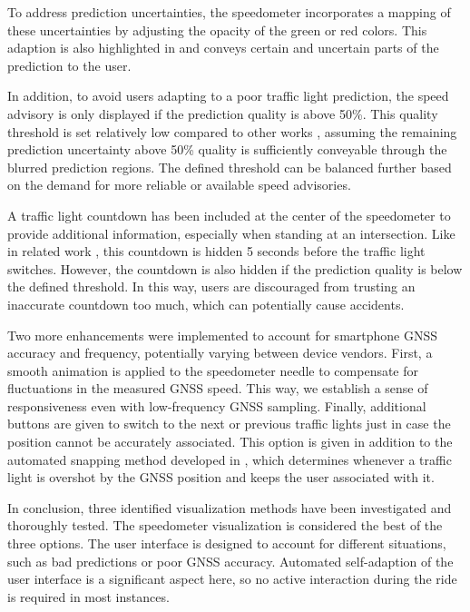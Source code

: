 To address prediction uncertainties, the speedometer incorporates a mapping of these uncertainties by adjusting the opacity of the green or red colors. This adaption is also highlighted in  and conveys certain and uncertain parts of the prediction to the user. 

In addition, to avoid users adapting to a poor traffic light prediction, the speed advisory is only displayed if the prediction quality is above 50\%. This quality threshold is set relatively low compared to other works \cite{protschky_extensive_2014, protschky_adaptive_2014}, assuming the remaining prediction uncertainty above 50\% quality is sufficiently conveyable through the blurred prediction regions. The defined threshold can be balanced further based on the demand for more reliable or available speed advisories. 

A traffic light countdown has been included at the center of the speedometer to provide additional information, especially when standing at an intersection. Like in related work \cite{stahlmann_exploring_2018, sokolov_effects_2018}, this countdown is hidden 5 seconds before the traffic light switches. However, the countdown is also hidden if the prediction quality is below the defined threshold. In this way, users are discouraged from trusting an inaccurate countdown too much, which can potentially cause accidents.

Two more enhancements were implemented to account for smartphone GNSS accuracy and frequency, potentially varying between device vendors. First, a smooth animation is applied to the speedometer needle to compensate for fluctuations in the measured GNSS speed. This way, we establish a sense of responsiveness even with low-frequency GNSS sampling. Finally, additional buttons are given to switch to the next or previous traffic lights just in case the position cannot be accurately associated. This option is given in addition to the automated snapping method developed in , which determines whenever a traffic light is overshot by the GNSS position and keeps the user associated with it.

In conclusion, three identified visualization methods have been investigated and thoroughly tested. The speedometer visualization is considered the best of the three options. The user interface is designed to account for different situations, such as bad predictions or poor GNSS accuracy. Automated self-adaption of the user interface is a significant aspect here, so no active interaction during the ride is required in most instances.

